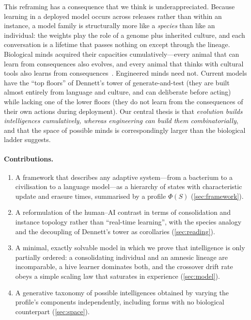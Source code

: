 \documentclass[11pt]{article}
\theoremstyle{plain}
\theoremstyle{definition}
\theoremstyle{remark}
\begin{document}
This reframing has a consequence that we think is underappreciated. Because learning in a deployed model occurs across releases rather than within an instance, a model family is structurally more like a \emph{species} than like an individual: the weights play the role of a genome plus inherited culture, and each conversation is a lifetime that passes nothing on except through the lineage. Biological minds acquired their capacities cumulatively---every animal that can learn from consequences also evolves, and every animal that thinks with cultural tools also learns from consequences~\citep{dennett1995darwin,dennett1996kinds}. Engineered minds need not. Current models have the ``top floors'' of Dennett's tower of generate-and-test (they are built almost entirely from language and culture, and can deliberate before acting) while lacking one of the lower floors (they do not learn from the consequences of their own actions during deployment). Our central thesis is that \emph{evolution builds intelligences cumulatively, whereas engineering can build them combinatorially}, and that the space of possible minds is correspondingly larger than the biological ladder suggests.

\paragraph{Contributions.}
\begin{enumerate}[leftmargin=*,itemsep=2pt]
\item A framework that describes any adaptive system---from a bacterium to a civilisation to a language model---as a hierarchy of states with characteristic update and erasure times, summarised by a profile $\Phi(S)$ (\cref{sec:framework}).
\item A reformulation of the human--AI contrast in terms of consolidation and instance topology rather than ``real-time learning'', with the species analogy and the decoupling of Dennett's tower as corollaries (\cref{sec:reading}).
\item A minimal, exactly solvable model in which we prove that intelligence is only partially ordered: a consolidating individual and an amnesic lineage are incomparable, a hive learner dominates both, and the crossover drift rate obeys a simple scaling law that saturates in experience (\cref{sec:model}).
\item A generative taxonomy of possible intelligences obtained by varying the profile's components independently, including forms with no biological counterpart (\cref{sec:space}).
\end{enumerate}
\end{document}

